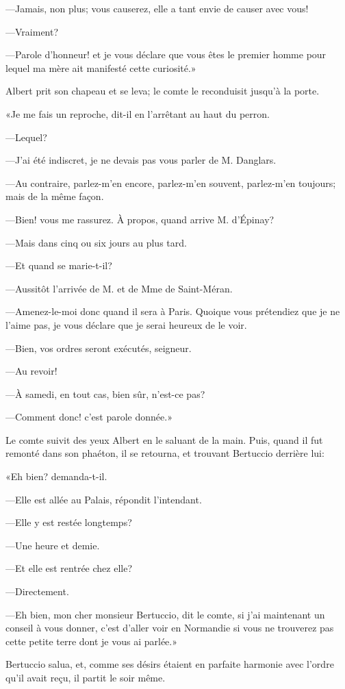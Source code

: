 —Jamais, non plus; vous causerez, elle a tant envie de causer avec vous! 

—Vraiment? 

—Parole d'honneur! et je vous déclare que vous êtes le premier homme pour lequel ma mère ait manifesté cette curiosité.» 

Albert prit son chapeau et se leva; le comte le reconduisit jusqu'à la porte. 

«Je me fais un reproche, dit-il en l'arrêtant au haut du perron. 

—Lequel? 

—J'ai été indiscret, je ne devais pas vous parler de M. Danglars. 

—Au contraire, parlez-m'en encore, parlez-m'en souvent, parlez-m'en toujours; mais de la même façon. 

—Bien! vous me rassurez. À propos, quand arrive M. d'Épinay? 

—Mais dans cinq ou six jours au plus tard. 

—Et quand se marie-t-il? 

—Aussitôt l'arrivée de M. et de Mme de Saint-Méran. 

—Amenez-le-moi donc quand il sera à Paris. Quoique vous prétendiez que je ne l'aime pas, je vous déclare que je serai heureux de le voir. 

—Bien, vos ordres seront exécutés, seigneur. 

—Au revoir! 

—À samedi, en tout cas, bien sûr, n'est-ce pas? 

—Comment donc! c'est parole donnée.» 

Le comte suivit des yeux Albert en le saluant de la main. Puis, quand il fut remonté dans son phaéton, il se retourna, et trouvant Bertuccio derrière lui: 

«Eh bien? demanda-t-il. 

—Elle est allée au Palais, répondit l'intendant. 

—Elle y est restée longtemps? 

—Une heure et demie. 

—Et elle est rentrée chez elle? 

—Directement. 

—Eh bien, mon cher monsieur Bertuccio, dit le comte, si j'ai maintenant un conseil à vous donner, c'est d'aller voir en Normandie si vous ne trouverez pas cette petite terre dont je vous ai parlée.» 

Bertuccio salua, et, comme ses désirs étaient en parfaite harmonie avec l'ordre qu'il avait reçu, il partit le soir même. 